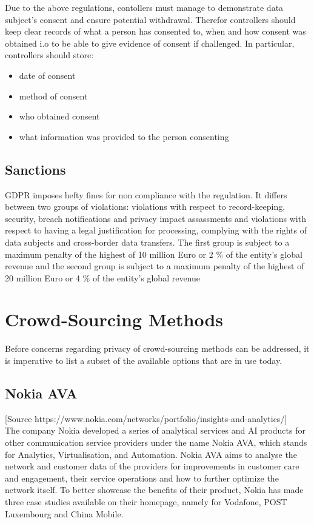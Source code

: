 \documentclass[a4paper,12pt]{report}
\begin{document}
	Due to the above regulations, contollers must manage to demonstrate data subject's consent and ensure potential withdrawal.
	Therefor controllers should keep clear records of what a person has consented to, when and how consent was obtained i.o to be able to give evidence of consent if challenged.
	In particular, controllers should store:
	\begin{itemize}
		\item date of consent
		\item method of consent
		\item who obtained consent
		\item what information was provided to the person consenting
	\end{itemize}


	\closesection

	\section{Sanctions}
	\startsection
	GDPR imposes hefty fines for non compliance with the regulation.
	It differs between two groups of violations: violations with respect to record-keeping, security, breach notifications and privacy impact assassments and violations with respect to having a legal justification for processing, complying with the rights of data subjects and cross-border data transfers.
	The first group is subject to a maximum penalty of the highest of 10 million Euro or 2 \% of the entity's global revenue and the second group is subject to a maximum penalty of the highest of 20 million Euro or 4 \% of the entity's global revenue
	\closesection
	
	
	
	
	\chapter{Crowd-Sourcing Methods}
	Before concerns regarding privacy of crowd-sourcing methods can be addressed, it is imperative to list a subset of the available options that are in use today.
	\section{Nokia AVA}
	[Source https://www.nokia.com/networks/portfolio/insights-and-analytics/]\\
	The company Nokia developed a series of analytical services and AI products for other communication service providers under the name Nokia AVA, which stands for Analytics, Virtualisation, and Automation. Nokia AVA aims to analyse the network and customer data of the providers for improvements in customer care and engagement, their service operations and how to further optimize the network itself.
	To better showcase the benefits of their product, Nokia has made three case studies available on their homepage, namely for Vodafone, POST Luxembourg and China Mobile.
	\startsection
\end{document}
